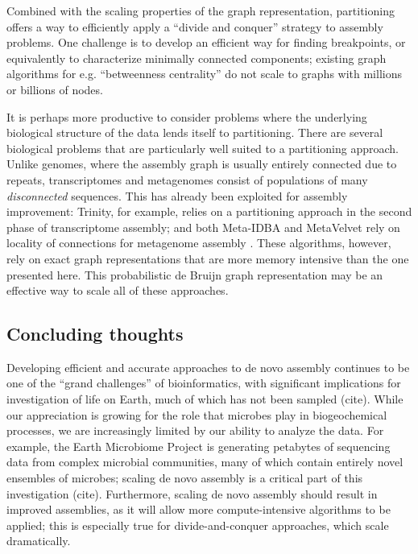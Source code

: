 \documentclass[12pt]{article} \usepackage{simplemargins}
\begin{document}
Combined with the scaling properties of the graph representation,
partitioning offers a way to efficiently apply a ``divide and conquer''
strategy to assembly problems.  One challenge is to develop an
efficient way for finding breakpoints, or equivalently to characterize
minimally connected components; existing graph algorithms for
e.g. ``betweenness centrality'' do not scale to graphs with millions or
billions of nodes.

It is perhaps more productive to consider problems where the
underlying biological structure of the data lends itself to
partitioning.  There are several biological problems that are
particularly well suited to a partitioning approach.  Unlike genomes,
where the assembly graph is usually entirely connected due to repeats,
transcriptomes and metagenomes consist of populations of many {\em
  disconnected} sequences.  This has already been exploited for
assembly improvement: Trinity, for example, relies on a partitioning
approach in the second phase of transcriptome assembly; and both
Meta-IDBA and MetaVelvet rely on locality of connections for
metagenome assembly \cite{trinity,pubmed21685107,metavelvet}.  These
algorithms, however, rely on exact graph representations that are more
memory intensive than the one presented here.  This probabilistic de
Bruijn graph representation may be an effective way to scale all of
these approaches.

\subsection{Concluding thoughts}


Developing efficient and accurate approaches to de novo assembly
continues to be one of the ``grand challenges'' of bioinformatics,
with significant implications for investigation of life on Earth, much
of which has not been sampled (cite).  While our appreciation is
growing for the role that microbes play in biogeochemical processes,
we are increasingly limited by our ability to analyze the data.  For
example, the Earth Microbiome Project is generating petabytes of
sequencing data from complex microbial communities, many of which
contain entirely novel ensembles of microbes; scaling de novo assembly
is a critical part of this investigation (cite).  Furthermore, scaling
de novo assembly should result in improved assemblies, as it will
allow more compute-intensive algorithms to be applied; this is
especially true for divide-and-conquer approaches, which scale
dramatically.
\end{document}

